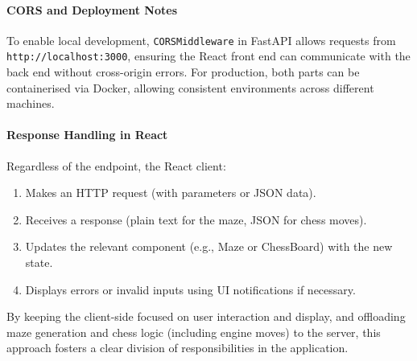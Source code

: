 \documentclass[12pt,a4paper]{article}
\begin{document}
\paragraph{CORS and Deployment Notes}
To enable local development, \texttt{CORSMiddleware} in FastAPI allows requests from \texttt{http://localhost:3000}, ensuring the React front end can communicate with the back end without cross-origin errors. For production, both parts can be containerised via Docker, allowing consistent environments across different machines.

\paragraph{Response Handling in React}
Regardless of the endpoint, the React client:
\begin{enumerate}
  \item Makes an HTTP request (with parameters or JSON data).
  \item Receives a response (plain text for the maze, JSON for chess moves).
  \item Updates the relevant component (e.g., Maze or ChessBoard) with the new state.
  \item Displays errors or invalid inputs using UI notifications if necessary.
\end{enumerate}

    By keeping the client-side focused on user interaction and display, and offloading maze generation and chess logic (including engine moves) to the server, this approach fosters a clear division of responsibilities in the application.
\end{document}
